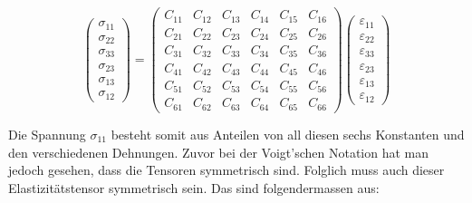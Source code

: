 \[
\begin{pmatrix}
	\sigma_{11} \\
	\sigma_{22} \\
	\sigma_{33} \\
	\sigma_{23} \\
	\sigma_{13} \\
	\sigma_{12}
\end{pmatrix}
=
\begin{pmatrix}
	C_{11} & C_{12} & C_{13} & C_{14} & C_{15} & C_{16} \\
	C_{21} & C_{22} & C_{23} & C_{24} & C_{25} & C_{26} \\
	C_{31} & C_{32} & C_{33} & C_{34} & C_{35} & C_{36} \\
	C_{41} & C_{42} & C_{43} & C_{44} & C_{45} & C_{46} \\
	C_{51} & C_{52} & C_{53} & C_{54} & C_{55} & C_{56} \\
	C_{61} & C_{62} & C_{63} & C_{64} & C_{65} & C_{66}
\end{pmatrix}
\begin{pmatrix}
	\varepsilon_{11} \\
	\varepsilon_{22} \\
	\varepsilon_{33} \\
	\varepsilon_{23} \\
	\varepsilon_{13} \\
	\varepsilon_{12}
\end{pmatrix}
\]

Die Spannung $\sigma_{11}$ besteht somit aus Anteilen von all diesen sechs Konstanten und den verschiedenen Dehnungen.
Zuvor bei der Voigt'schen Notation hat man jedoch gesehen, dass die Tensoren symmetrisch sind.
Folglich muss auch dieser Elastizitätstensor symmetrisch sein.
Das sind folgendermassen aus:

